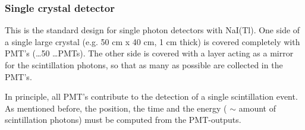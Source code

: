 \documentclass[11pt,oneside]{book}
\begin{document}
\subsubsection{Single crystal detector} \label{sec:single_crystal}
This is the standard design for single photon detectors with NaI(Tl). One
side of a single large crystal (e.g. 50 cm x 40 cm, 1 cm thick) is covered
completely with PMT's (\ldots 50 \ldots PMTs). The other side is covered with
a layer acting as a mirror for the scintillation photons, so that as many as
possible are collected in the PMT's.

In principle, all PMT's contribute to the detection of a single
scintillation event. As mentioned before, the position, the time and the
energy ( $\sim$ amount of scintillation photons) must be computed from the
PMT-outputs.
%
\end{document}
